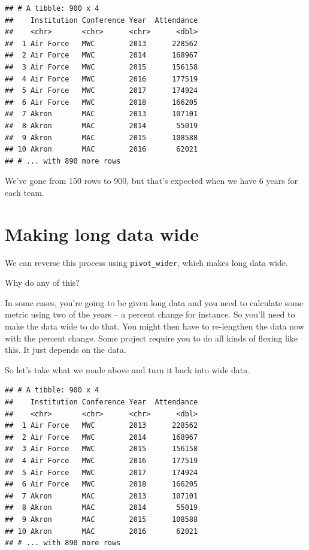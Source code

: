 \documentclass[]{book}
\newenvironment{Shaded}{\begin{snugshade}}{\end{snugshade}}
\newcommand{\DataTypeTok}[1]{\textcolor[rgb]{0.13,0.29,0.53}{#1}}
\newcommand{\KeywordTok}[1]{\textcolor[rgb]{0.13,0.29,0.53}{\textbf{#1}}}
\newcommand{\NormalTok}[1]{#1}
\newcommand{\OperatorTok}[1]{\textcolor[rgb]{0.81,0.36,0.00}{\textbf{#1}}}
\newcommand{\StringTok}[1]{\textcolor[rgb]{0.31,0.60,0.02}{#1}}
\begin{document}
\begin{verbatim}
## # A tibble: 900 x 4
##    Institution Conference Year  Attendance
##    <chr>       <chr>      <chr>      <dbl>
##  1 Air Force   MWC        2013      228562
##  2 Air Force   MWC        2014      168967
##  3 Air Force   MWC        2015      156158
##  4 Air Force   MWC        2016      177519
##  5 Air Force   MWC        2017      174924
##  6 Air Force   MWC        2018      166205
##  7 Akron       MAC        2013      107101
##  8 Akron       MAC        2014       55019
##  9 Akron       MAC        2015      108588
## 10 Akron       MAC        2016       62021
## # ... with 890 more rows
\end{verbatim}

We've gone from 150 rows to 900, but that's expected when we have 6 years for each team.

\hypertarget{making-long-data-wide}{%
\section{Making long data wide}\label{making-long-data-wide}}

We can reverse this process using \texttt{pivot\_wider}, which makes long data wide.

Why do any of this?

In some cases, you're going to be given long data and you need to calculate some metric using two of the years -- a percent change for instance. So you'll need to make the data wide to do that. You might then have to re-lengthen the data now with the percent change. Some project require you to do all kinds of flexing like this. It just depends on the data.

So let's take what we made above and turn it back into wide data.

\begin{Shaded}
\end{Shaded}

\begin{verbatim}
## # A tibble: 900 x 4
##    Institution Conference Year  Attendance
##    <chr>       <chr>      <chr>      <dbl>
##  1 Air Force   MWC        2013      228562
##  2 Air Force   MWC        2014      168967
##  3 Air Force   MWC        2015      156158
##  4 Air Force   MWC        2016      177519
##  5 Air Force   MWC        2017      174924
##  6 Air Force   MWC        2018      166205
##  7 Akron       MAC        2013      107101
##  8 Akron       MAC        2014       55019
##  9 Akron       MAC        2015      108588
## 10 Akron       MAC        2016       62021
## # ... with 890 more rows
\end{verbatim}
\end{document}
